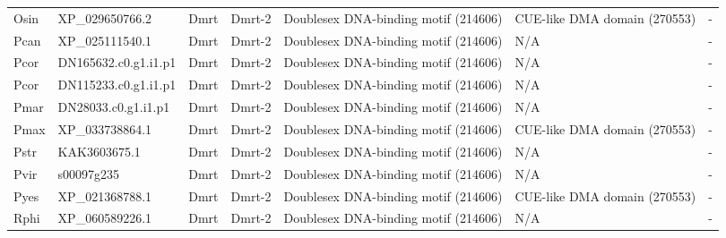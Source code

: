\documentclass[../main.tex]{subfiles}
\begin{document}
\begin{landscape}
\begin{longtable}{lllllll}
		Osin           & XP\_029650766.2       & Dmrt           & Dmrt-2              & Doublesex DNA-binding motif (214606)        & CUE-like DMA domain (270553)                                           & -                    \\
		Pcan           & XP\_025111540.1       & Dmrt           & Dmrt-2              & Doublesex DNA-binding motif (214606)        & N/A                                                                    & -                    \\
		Pcor           & DN165632.c0.g1.i1.p1  & Dmrt           & Dmrt-2              & Doublesex DNA-binding motif (214606)        & N/A                                                                    & -                    \\
		Pcor           & DN115233.c0.g1.i1.p1  & Dmrt           & Dmrt-2              & Doublesex DNA-binding motif (214606)        & N/A                                                                    & -                    \\
		Pmar           & DN28033.c0.g1.i1.p1   & Dmrt           & Dmrt-2              & Doublesex DNA-binding motif (214606)        & N/A                                                                    & -                    \\
		Pmax           & XP\_033738864.1       & Dmrt           & Dmrt-2              & Doublesex DNA-binding motif (214606)        & CUE-like DMA domain (270553)                                           & -                    \\
		Pstr           & KAK3603675.1          & Dmrt           & Dmrt-2              & Doublesex DNA-binding motif (214606)        & N/A                                                                    & -                    \\
		Pvir           & s00097g235            & Dmrt           & Dmrt-2              & Doublesex DNA-binding motif (214606)        & N/A                                                                    & -                    \\
		Pyes           & XP\_021368788.1       & Dmrt           & Dmrt-2              & Doublesex DNA-binding motif (214606)        & CUE-like DMA domain (270553)                                           & -                    \\
		Rphi           & XP\_060589226.1       & Dmrt           & Dmrt-2              & Doublesex DNA-binding motif (214606)        & N/A                                                                    & -                    \\

\end{longtable}
\end{landscape}
\end{document}
